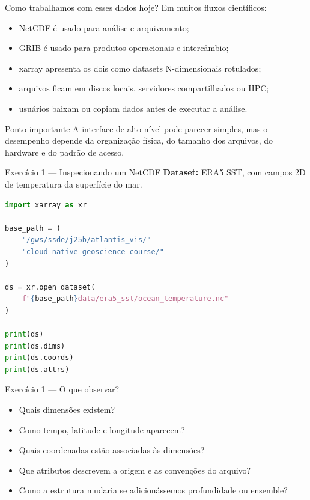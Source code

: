\documentclass[aspectratio=169]{beamer}
\begin{document}
\begin{frame}{Como trabalhamos com esses dados hoje?}
Em muitos fluxos científicos:

\begin{itemize}
  \item NetCDF é usado para análise e arquivamento;
  \item GRIB é usado para produtos operacionais e intercâmbio;
  \item xarray apresenta os dois como datasets N-dimensionais rotulados;
  \item arquivos ficam em discos locais, servidores compartilhados ou HPC;
  \item usuários baixam ou copiam dados antes de executar a análise.
\end{itemize}

\vspace{0.4cm}

\begin{block}{Ponto importante}
A interface de alto nível pode parecer simples, mas o desempenho depende da organização física, do tamanho dos arquivos, do hardware e do padrão de acesso.
\end{block}
\end{frame}

\begin{frame}[fragile]{Exercício 1 --- Inspecionando um NetCDF}
\textbf{Dataset:} ERA5 SST, com campos 2D de temperatura da superfície do mar.

\vspace{0.25cm}

\begin{lstlisting}[language=Python]
import xarray as xr

base_path = (
    "/gws/ssde/j25b/atlantis_vis/"
    "cloud-native-geoscience-course/"
)

ds = xr.open_dataset(
    f"{base_path}data/era5_sst/ocean_temperature.nc"
)

print(ds)
print(ds.dims)
print(ds.coords)
print(ds.attrs)
\end{lstlisting}
\end{frame}

\begin{frame}{Exercício 1 --- O que observar?}
\begin{itemize}
  \item Quais dimensões existem?
  \item Como tempo, latitude e longitude aparecem?
  \item Quais coordenadas estão associadas às dimensões?
  \item Que atributos descrevem a origem e as convenções do arquivo?
  \item Como a estrutura mudaria se adicionássemos profundidade ou ensemble?
\end{itemize}

\end{frame}
\end{document}
